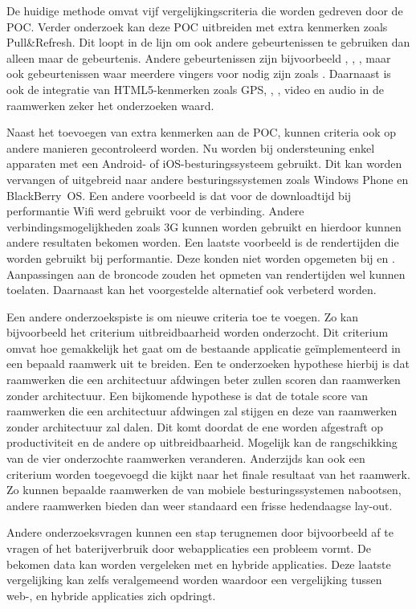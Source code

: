De huidige methode omvat vijf vergelijkingscriteria die worden gedreven door de POC.
Verder onderzoek kan deze POC uitbreiden met extra kenmerken zoals Pull&Refresh.
Dit loopt in de lijn om ook andere gebeurtenissen te gebruiken dan alleen maar de  gebeurtenis.
Andere gebeurtenissen zijn bijvoorbeeld , , , maar ook gebeurtenissen waar meerdere vingers voor nodig zijn zoals .
Daarnaast is ook de integratie van HTML5-kenmerken zoals GPS, , , video en audio in de raamwerken zeker het onderzoeken waard.

Naast het toevoegen van extra kenmerken aan de POC, kunnen criteria ook op andere manieren gecontroleerd worden.
Nu worden bij ondersteuning enkel apparaten met een Android- of iOS-besturingssysteem gebruikt.
Dit kan worden vervangen of uitgebreid naar andere besturingssystemen zoals Windows Phone en BlackBerry~OS.
Een andere voorbeeld is dat voor de downloadtijd bij performantie Wifi werd gebruikt voor de verbinding.
Andere verbindingsmogelijkheden zoals 3G kunnen worden gebruikt en hierdoor kunnen andere resultaten bekomen worden.
Een laatste voorbeeld is de rendertijden die worden gebruikt bij performantie.
Deze konden niet worden opgemeten bij \st{} en \lungo{}.
Aanpassingen aan de broncode zouden het opmeten van rendertijden wel kunnen toelaten.
Daarnaast kan het voorgestelde alternatief ook verbeterd worden.

Een andere onderzoekspiste is om nieuwe criteria toe te voegen.
Zo kan bijvoorbeeld het criterium uitbreidbaarheid worden onderzocht.
Dit criterium omvat hoe gemakkelijk het gaat om de bestaande applicatie geïmplementeerd in een bepaald raamwerk uit te breiden.
Een te onderzoeken hypothese hierbij is dat raamwerken die een architectuur afdwingen beter zullen scoren dan raamwerken zonder architectuur.
Een bijkomende hypothese is dat de totale score van raamwerken die een architectuur afdwingen zal stijgen en deze van raamwerken zonder architectuur zal dalen.
Dit komt doordat de ene worden afgestraft op productiviteit en de andere op uitbreidbaarheid.
Mogelijk kan de rangschikking van de vier onderzochte raamwerken veranderen.
Anderzijds kan ook een criterium worden toegevoegd die kijkt naar het finale resultaat van het raamwerk.
Zo kunnen bepaalde raamwerken de  van mobiele besturingssystemen  nabootsen, andere raamwerken bieden dan weer standaard een frisse hedendaagse lay-out.

Andere onderzoeksvragen kunnen een stap terugnemen door bijvoorbeeld af te vragen of het baterijverbruik door webapplicaties een probleem vormt.
De bekomen data kan worden vergeleken met  en hybride applicaties.
Deze laatste vergelijking kan zelfs veralgemeend worden waardoor een vergelijking tussen web-,  en hybride applicaties zich opdringt. 


